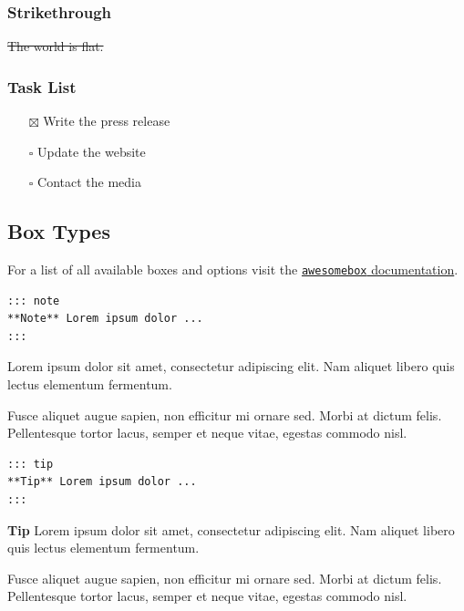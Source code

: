 \documentclass[
  a4paper,
  ,captions=tableheading
]{scrartcl}
\newcommand{\passthrough}[1]{#1}
\providecommand{\tightlist}{%
  \setlength{\itemsep}{0pt}\setlength{\parskip}{0pt}}
\begin{document}
\subsubsection{Strikethrough}\label{strikethrough}

\st{The world is flat.}

\subsubsection{Task List}\label{task-list}

\begin{itemize}
\tightlist
\item[$\boxtimes$]
  Write the press release
\item[$\square$]
  Update the website
\item[$\square$]
  Contact the media
\end{itemize}

\subsection{Box Types}\label{box-types}

For a list of all available boxes and options visit the
\href{https://ctan.org/pkg/awesomebox}{\passthrough{\lstinline!awesomebox!}
documentation}.

\begin{lstlisting}
::: note
**Note** Lorem ipsum dolor ...
:::
\end{lstlisting}

\begin{noteblock}
Lorem ipsum dolor sit amet, consectetur adipiscing elit. Nam aliquet
libero quis lectus elementum fermentum.

Fusce aliquet augue sapien, non efficitur mi ornare sed. Morbi at dictum
felis. Pellentesque tortor lacus, semper et neque vitae, egestas commodo
nisl.
\end{noteblock}

\begin{lstlisting}
::: tip
**Tip** Lorem ipsum dolor ...
:::
\end{lstlisting}

\begin{tipblock}
\textbf{Tip} Lorem ipsum dolor sit amet, consectetur adipiscing elit.
Nam aliquet libero quis lectus elementum fermentum.

Fusce aliquet augue sapien, non efficitur mi ornare sed. Morbi at dictum
felis. Pellentesque tortor lacus, semper et neque vitae, egestas commodo
nisl.
\end{tipblock}
\end{document}
